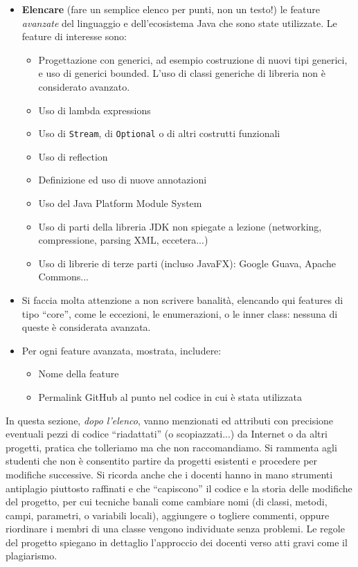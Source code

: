 \documentclass[a4paper,12pt]{report}
\begin{document}
\begin{itemize}
	\item \textbf{Elencare} (fare un semplice elenco per punti, non un testo!) le feature \textit{avanzate} del linguaggio e dell'ecosistema Java che sono state
utilizzate. Le feature di interesse sono:
	\begin{itemize}
		\item Progettazione con generici, ad esempio costruzione di nuovi tipi generici, e uso di generici bounded.
		L'uso di classi generiche di libreria non è considerato avanzato.
		\item Uso di lambda expressions
		\item Uso di \texttt{Stream}, di \texttt{Optional} o di altri costrutti funzionali
		\item Uso di reflection
		\item Definizione ed uso di nuove annotazioni
		\item Uso del Java Platform Module System
		\item Uso di parti della libreria JDK non spiegate a lezione (networking, compressione, parsing XML, eccetera...)
		\item Uso di librerie di terze parti (incluso JavaFX): Google Guava, Apache Commons...
	\end{itemize}
	\item Si faccia molta attenzione a non scrivere banalità, elencando qui features di tipo ``core'', come le eccezioni, le enumerazioni, o le inner class: nessuna di queste è considerata avanzata.
	\item Per ogni feature avanzata, mostrata, includere:
	\begin{itemize}
		\item Nome della feature
		\item Permalink GitHub al punto nel codice in cui è stata utilizzata
	\end{itemize}
\end{itemize}

In questa sezione, \textit{dopo l'elenco},
vanno menzionati ed attributi con precisione eventuali pezzi di codice ``riadattati'' (o scopiazzati...) da Internet o da altri progetti,
pratica che tolleriamo ma che non raccomandiamo.
%
Si rammenta agli studenti che non è consentito partire da progetti esistenti e procedere per modifiche successive.
%
Si ricorda anche che i docenti hanno in mano strumenti antiplagio piuttosto raffinati e che ``capiscono'' il codice e la storia delle modifiche del progetto,
per cui tecniche banali come cambiare nomi (di classi, metodi, campi, parametri, o variabili locali),
aggiungere o togliere commenti,
oppure riordinare i membri di una classe vengono individuate senza problemi.
%
Le regole del progetto spiegano in dettaglio l'approccio dei docenti verso atti gravi come il plagiarismo.
\end{document}
